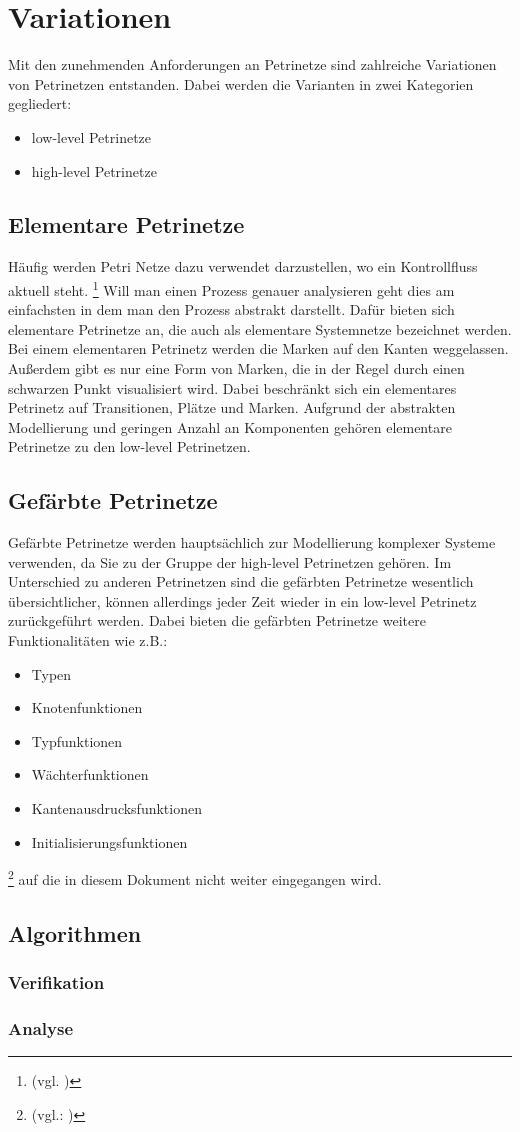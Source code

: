 \section{Variationen}
Mit den zunehmenden Anforderungen an Petrinetze sind zahlreiche Variationen von Petrinetzen entstanden.
Dabei werden die Varianten in zwei Kategorien gegliedert:
\begin{itemize}
    \item low-level Petrinetze
    \item high-level Petrinetze
\end{itemize}

\subsection{Elementare Petrinetze}
Häufig werden Petri Netze dazu verwendet darzustellen, wo ein Kontrollfluss aktuell steht. \footnote{(vgl. \cite[Seite 39]{hu_berlin:petrinetze})}
Will man einen Prozess genauer analysieren geht dies am einfachsten in dem man den Prozess abstrakt darstellt.
Dafür bieten sich elementare Petrinetze an, die auch als elementare Systemnetze bezeichnet werden.\\
Bei einem elementaren Petrinetz werden die Marken auf den Kanten weggelassen. Außerdem gibt es nur eine Form von Marken, die in der Regel durch einen schwarzen Punkt \textbullet visualisiert wird.
Dabei beschränkt sich ein elementares Petrinetz auf Transitionen, Plätze und Marken.
Aufgrund der abstrakten Modellierung und geringen Anzahl an Komponenten gehören elementare Petrinetze zu den low-level Petrinetzen.

\subsection{Gefärbte Petrinetze}
Gefärbte Petrinetze werden hauptsächlich zur Modellierung komplexer Systeme verwenden, da Sie zu der Gruppe der high-level Petrinetzen gehören.
Im Unterschied zu anderen Petrinetzen sind die gefärbten Petrinetze wesentlich übersichtlicher, können allerdings jeder Zeit wieder in ein low-level Petrinetz zurückgeführt werden.
Dabei bieten die gefärbten Petrinetze weitere Funktionalitäten wie z.B.:
\begin{itemize}
    \item Typen
    \item Knotenfunktionen
    \item Typfunktionen
    \item Wächterfunktionen
    \item Kantenausdrucksfunktionen
    \item Initialisierungsfunktionen
\end{itemize}
\footnote{(vgl.: \cite{tu_dresden:petrinetze})}
auf die in diesem Dokument nicht weiter eingegangen wird.


\subsection{Algorithmen}

\subsubsection{Verifikation}

\subsubsection{Analyse}

